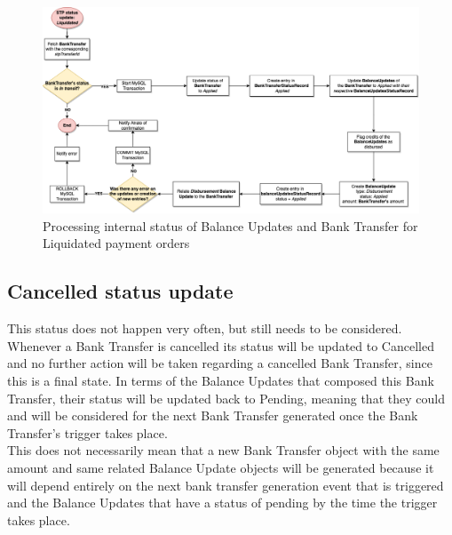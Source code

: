\begin{figure} [h]
    \centering
    \includegraphics[scale = 0.4]{assets/diagrams/LiquidatedStatusUpdate.png}
    \caption{Processing internal status of Balance Updates and Bank Transfer for Liquidated payment orders}\label{fig:liquidated_status_update}
\end{figure}

\subsection{Cancelled status update}

This status does not happen very often, but still needs to be considered. Whenever a Bank Transfer is cancelled its status will be updated to Cancelled and no further action will be taken regarding a cancelled Bank Transfer, since this is a final state. In terms of the Balance Updates that composed this Bank Transfer, their status will be updated back to Pending, meaning that they could and will be considered for the next Bank Transfer generated once the Bank Transfer’s trigger takes place.\\

This does not necessarily mean that a new Bank Transfer object with the same amount and same related Balance Update objects will be generated because it will depend entirely on the next bank transfer generation event that is triggered and the Balance Updates that have a status of pending by the time the trigger takes place.

